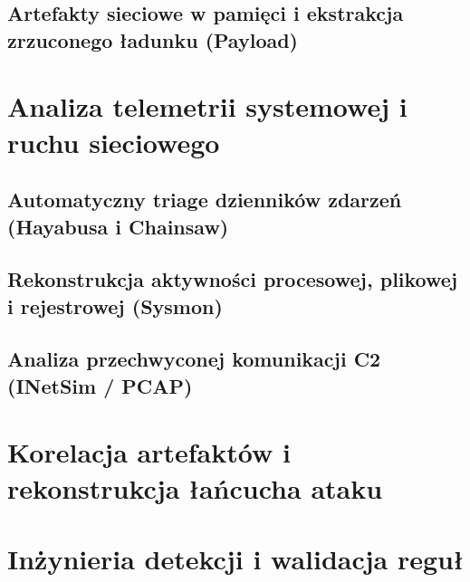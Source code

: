 \subsection{Artefakty sieciowe w pamięci i ekstrakcja zrzuconego ładunku (Payload)}\label{subsec:cs1_ekstrakcja_payload}

\section{Analiza telemetrii systemowej i ruchu sieciowego}\label{sec:cs1_analiza_logow}

\subsection{Automatyczny triage dzienników zdarzeń (Hayabusa i Chainsaw)}\label{subsec:cs1_triage_evtx}

\subsection{Rekonstrukcja aktywności procesowej, plikowej i rejestrowej (Sysmon)}\label{subsec:cs1_sysmon_analiza}

\subsection{Analiza przechwyconej komunikacji C2 (INetSim / PCAP)}\label{subsec:cs1_analiza_sieci}

\section{Korelacja artefaktów i rekonstrukcja łańcucha ataku}\label{sec:cs1_korelacja}

\section{Inżynieria detekcji i walidacja reguł}\label{sec:cs1_inzynieria_detekcji}

